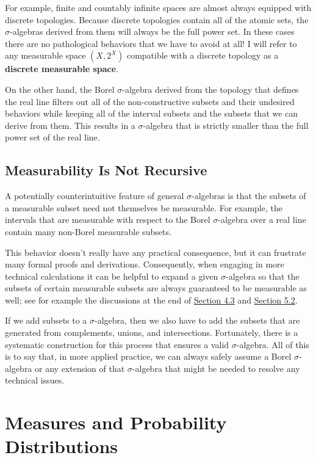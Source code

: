 \documentclass[
  letterpaper,
  DIV=11,
  numbers=noendperiod]{scrartcl}
\begin{document}
For example, finite and countably infinite spaces are almost always
equipped with discrete topologies. Because discrete topologies contain
all of the atomic sets, the \(\sigma\)-algebras derived from them will
always be the full power set. In these cases there are no pathological
behaviors that we have to avoid at all! I will refer to any measurable
space \((X, 2^{X})\) compatible with a discrete topology as a
\textbf{discrete measurable space}.

On the other hand, the Borel \(\sigma\)-algebra derived from the
topology that defines the real line filters out all of the
non-constructive subsets and their undesired behaviors while keeping all
of the interval subsets and the subsets that we can derive from them.
This results in a \(\sigma\)-algebra that is strictly smaller than the
full power set of the real line.

\subsection{Measurability Is Not
Recursive}\label{measurability-is-not-recursive}

A potentially counterintuitive feature of general \(\sigma\)-algebras is
that the subsets of a measurable subset need not themselves be
measurable. For example, the intervals that are measurable with respect
to the Borel \(\sigma\)-algebra over a real line contain many non-Borel
measurable subsets.

This behavior doesn't really have any practical consequence, but it can
frustrate many formal proofs and derivations. Consequently, when
engaging in more technical calculations it can be helpful to expand a
given \(\sigma\)-algebra so that the subsets of certain measurable
subsets are always guaranteed to be measurable as well; see for example
the discussions at the end of \hyperref[sec:null]{Section 4.3} and
\hyperref[sec:lebesgue]{Section 5.2}.

If we add subsets to a \(\sigma\)-algebra, then we also have to add the
subsets that are generated from complements, unions, and intersections.
Fortunately, there is a systematic construction for this process that
ensures a valid \(\sigma\)-algebra. All of this is to say that, in more
applied practice, we can always safely assume a Borel \(\sigma\)-algebra
or any extension of that \(\sigma\)-algebra that might be needed to
resolve any technical issues.

\section{Measures and Probability
Distributions}\label{measures-and-probability-distributions}
\end{document}
